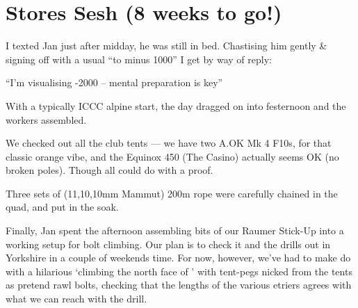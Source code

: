 \section{Stores Sesh (8 weeks to go!)}



I texted Jan just after midday, he was still in bed. Chastising him
gently \& signing off with a usual “to minus 1000” I get by way of
reply:

“I’m visualising -2000 – mental preparation is key”

With a typically ICCC alpine start, the day dragged on into festernoon and the workers assembled.

We checked out all the club tents — we have two A.OK Mk 4 F10s, for
that classic orange vibe, and the Equinox 450 (The Casino) actually
seems OK (no broken poles). Though all could do with a proof.

Three sets of (11,10,10mm Mammut) 200m rope were carefully chained in
the quad, and put in the soak.

Finally, Jan spent the afternoon assembling bits of our Raumer
Stick-Up into a working setup for bolt climbing. Our plan is to check
it and the drills out in Yorkshire in a couple of weekends time. For
now, however, we’ve had to make do with a hilarious ‘climbing the
north face of ’ with tent-pegs nicked from the tents as
pretend rawl bolts, checking that the lengths of the various etriers
agrees with what we can reach with the drill. 

